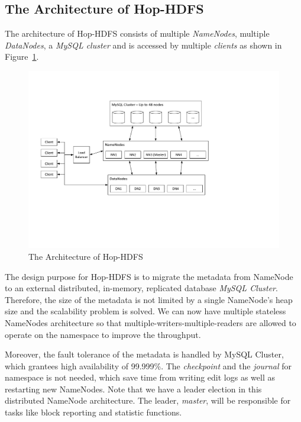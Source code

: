 \subsection{The Architecture of Hop-HDFS}

\noindent The architecture of Hop-HDFS consists of multiple \textit{NameNodes}, multiple \textit{DataNodes}, a \textit{MySQL cluster} and is accessed by multiple \textit{clients} as shown in Figure~\ref{fig:hophdfsarchitecture}.

\begin{figure}[h!]
	\centering
	\includegraphics[scale=0.7]{figs/HopHDFSArchitecture.pdf}
	\caption{The Architecture of Hop-HDFS}
	\label{fig:hophdfsarchitecture}
\end{figure}

\noindent The design purpose for Hop-HDFS is to migrate the metadata from NameNode to an external distributed, in-memory, replicated database \textit{MySQL Cluster}. Therefore, the size of the metadata is not limited by a single NameNode's heap size and the scalability problem is solved. We can now have multiple stateless NameNodes architecture so that multiple-writers-multiple-readers are allowed to operate on the namespace to improve the throughput. 

\noindent Moreover, the fault tolerance of the metadata is handled by MySQL Cluster, which grantees high availability of 99.999\%. The \textit{checkpoint} and the \textit{journal} for namespace is not needed, which save time from writing edit logs as well as restarting new NameNodes. Note that we have a leader election in this distributed NameNode architecture. The leader, \textit{master}, will be responsible for tasks like block reporting and statistic functions.

